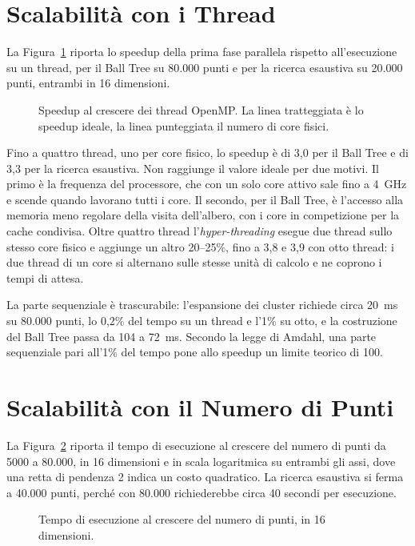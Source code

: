 \section{Scalabilità con i Thread}

La Figura~\ref{fig:threads} riporta lo speedup della prima fase parallela rispetto all'esecuzione su un thread, per il Ball Tree su 80.000 punti e per la ricerca esaustiva su 20.000 punti, entrambi in 16 dimensioni.

\begin{figure}[H]
    \centering
    
    \caption{Speedup al crescere dei thread OpenMP. La linea tratteggiata è lo speedup ideale, la linea punteggiata il numero di core fisici.}
    \label{fig:threads}
\end{figure}

Fino a quattro thread, uno per core fisico, lo speedup è di 3,0 per il Ball Tree e di 3,3 per la ricerca esaustiva. Non raggiunge il valore ideale per due motivi. Il primo è la frequenza del processore, che con un solo core attivo sale fino a 4~GHz e scende quando lavorano tutti i core. Il secondo, per il Ball Tree, è l'accesso alla memoria meno regolare della visita dell'albero, con i core in competizione per la cache condivisa. Oltre quattro thread l'\emph{hyper-threading} esegue due thread sullo stesso core fisico e aggiunge un altro 20--25\%, fino a 3,8 e 3,9 con otto thread: i due thread di un core si alternano sulle stesse unità di calcolo e ne coprono i tempi di attesa.

La parte sequenziale è trascurabile: l'espansione dei cluster richiede circa 20~ms su 80.000 punti, lo 0,2\% del tempo su un thread e l'1\% su otto, e la costruzione del Ball Tree passa da 104 a 72~ms. Secondo la legge di Amdahl, una parte sequenziale pari all'1\% del tempo pone allo speedup un limite teorico di 100.

\section{Scalabilità con il Numero di Punti}

La Figura~\ref{fig:scaling} riporta il tempo di esecuzione al crescere del numero di punti da 5000 a 80.000, in 16 dimensioni e in scala logaritmica su entrambi gli assi, dove una retta di pendenza 2 indica un costo quadratico. La ricerca esaustiva si ferma a 40.000 punti, perché con 80.000 richiederebbe circa 40 secondi per esecuzione.

\begin{figure}[H]
    \centering
    
    \caption{Tempo di esecuzione al crescere del numero di punti, in 16 dimensioni.}
    \label{fig:scaling}
\end{figure}

